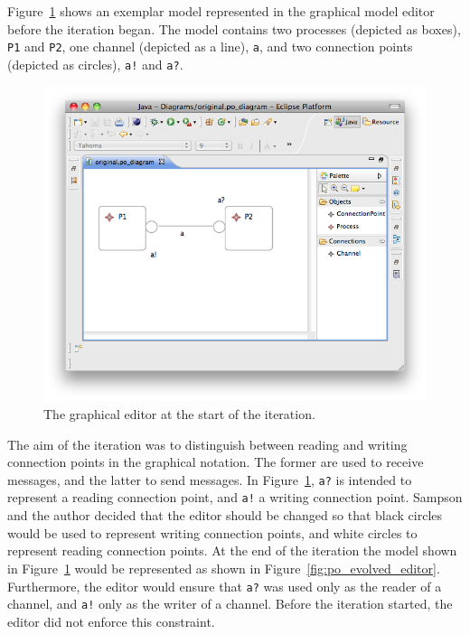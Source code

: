 Figure~\ref{fig:po_original_editor} shows an exemplar model represented in the graphical model editor before the iteration began. The model contains two processes (depicted as boxes), \texttt{P1} and \texttt{P2}, one channel (depicted as a line), \texttt{a}, and two connection points (depicted as circles), \texttt{a!} and \texttt{a?}.

\begin{figure}[htbp]
	\centering
	\includegraphics[width=13.5cm]{6.Evaluation/images/user_driven/po_original_editor.png}
	\caption{The graphical editor at the start of the iteration.}
	\label{fig:po_original_editor}
\end{figure}


The aim of the iteration was to distinguish between reading and writing connection points in the graphical notation. The former are used to receive messages, and the latter to send messages. In Figure~\ref{fig:po_original_editor}, \texttt{a?} is intended to represent a reading connection point, and \texttt{a!} a writing connection point. Sampson and the author decided that the editor should be changed so that black circles would be used to represent writing connection points, and white circles to represent reading connection points. At the end of the iteration the model shown in Figure~\ref{fig:po_original_editor} would be represented as shown in Figure~\ref{fig:po_evolved_editor}. Furthermore, the editor would ensure that \texttt{a?} was used only as the reader of a channel, and \texttt{a!} only as the writer of a channel. Before the iteration started, the editor did not enforce this constraint.

